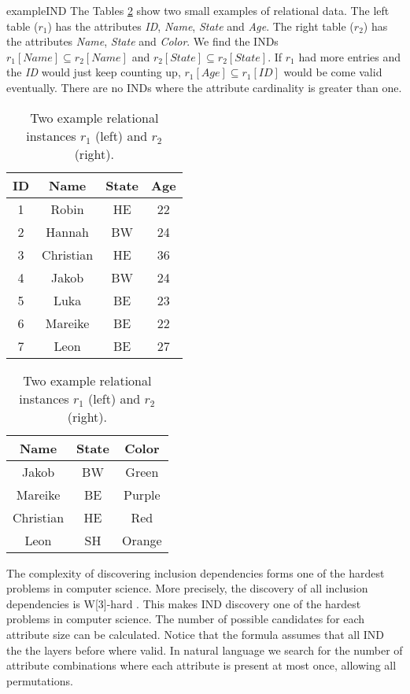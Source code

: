 \begin{restatable}{example}{IND}\label{exmp:IND}
    The Tables \ref{tab:relExamp} show two small examples of relational data. The left table ($r_1$) has the attributes \textit{ID}, \textit{Name}, \textit{State} and \textit{Age}. The right table ($r_2$) has the attributes \textit{Name}, \textit{State} and \textit{Color}. We find the INDs $r_1[Name] \subseteq r_2[Name]$ and $r_2[State] \subseteq r_2[State]$. If $r_1$ had more entries and the \textit{ID} would just keep counting up, $r_1[Age] \subseteq r_1[ID]$ would be come valid eventually. There are no INDs where the attribute cardinality is greater than one.
\end{restatable}

\begin{table}[]
    \centering
    \begin{tabular}{c|c|c|c}
        ID & Name & State & Age \\
        \hline
        1 & Robin & HE & 22 \\
        2 & Hannah & BW & 24 \\
        3 & Christian & HE & 36 \\
        4 & Jakob & BW & 24 \\
        5 & Luka & BE & 23 \\
        6 & Mareike & BE & 22 \\
        7 & Leon & BE & 27 \\
    \end{tabular}
    \begin{tabular}{c|c|c}
        Name & State & Color \\
        \hline
        Jakob & BW & Green \\
        Mareike & BE & Purple \\
        Christian & HE & Red \\
        Leon & SH & Orange \\
    \end{tabular}
    \caption{Two example relational instances $r_1$ (left) and $r_2$ (right).}
    \label{tab:relExamp}
\end{table}

The complexity of discovering inclusion dependencies forms one of the hardest problems in computer science. More precisely, the discovery of all inclusion dependencies is W[3]-hard \cite{blasius2017parameterized}. This makes IND discovery one of the hardest problems in computer science. The number of possible candidates for each attribute size can be calculated. Notice that the formula assumes that all IND the the layers before where valid. In natural language we search for the number of attribute combinations where each attribute is present at most once, allowing all permutations.

